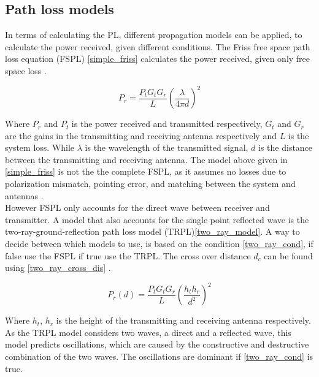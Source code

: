 \subsection{Path loss models}

In terms of calculating the PL, different propagation models can be applied, to calculate the power received, given different conditions. The Friss free space path loss equation (FSPL) \eqref{simple_friss} calculates the power received, given only free space loss \cite{Chong}.

\begin{equation}
P_r = \frac{P_t G_t G_r}{L} \left(\frac{\lambda}{4 \pi d}\right)^2
\label{simple_friss}
\end{equation}

Where $P_{r}$ and $P_{t}$ is the power received and transmitted respectively, $G_t$ and $G_r$ are the gains in the transmitting and receiving antenna respectively and $L$ is the system loss. While $\lambda$ is the wavelength of the transmitted signal, $d$ is the distance between the transmitting and receiving antenna. The model above given in \eqref{simple_friss} is not the the complete FSPL, as it assumes no losses due to polarization mismatch, pointing error, and matching between the system and antennas \cite{full_friss}. \\

However FSPL only accounts for the direct wave between receiver and transmitter. A model that also accounts for the single point reflected wave is the two-ray-ground-reflection path loss model (TRPL)\eqref{two_ray_model}. A way to decide between which models to use, is based on the condition \eqref{two_ray_cond}, if false use the FSPL if true use the TRPL. The cross over distance $d_c$ can be found using \eqref{two_ray_cross_dis} \cite{two_ray}. 


\begin{equation}
P_r(d) = \frac{P_t G_t G_r }{L}\left(\frac{h_t h_r}{d^2}\right)^2
\label{two_ray_model}
\end{equation}

Where $h_t$, $h_r$ is the height of the transmitting and receiving antenna respectively. \\
As the TRPL model considers two waves, a direct and a reflected wave, this model predicts oscillations, which are caused by the constructive and destructive combination of the two waves. The oscillations are dominant if \eqref{two_ray_cond} is true\cite{two_ray}.


